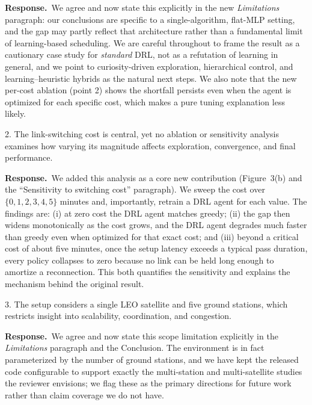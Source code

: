 \documentclass[11pt]{article}
\newcommand{\resp}{\par\smallskip\noindent\textbf{Response.}\ }
\begin{document}
\resp We agree and now state this explicitly in the new \emph{Limitations}
paragraph: our conclusions are specific to a single-algorithm, flat-MLP setting,
and the gap may partly reflect that architecture rather than a fundamental limit of
learning-based scheduling. We are careful throughout to frame the result as a
cautionary case study for \emph{standard} DRL, not as a refutation of learning in
general, and we point to curiosity-driven exploration, hierarchical control, and
learning--heuristic hybrids as the natural next steps. We also note that the new
per-cost ablation (point 2) shows the shortfall persists even when the agent is
optimized for each specific cost, which makes a pure tuning explanation less likely.

\begin{rc}
2. The link-switching cost is central, yet no ablation or sensitivity analysis
examines how varying its magnitude affects exploration, convergence, and final
performance.
\end{rc}

\resp We added this analysis as a core new contribution (Figure~3(b) and the
``Sensitivity to switching cost'' paragraph). We sweep the cost over
$\{0,1,2,3,4,5\}$ minutes and, importantly, retrain a DRL agent for each value.
The findings are: (i) at zero cost the DRL agent matches greedy; (ii) the gap then
widens monotonically as the cost grows, and the DRL agent degrades much faster than
greedy even when optimized for that exact cost; and (iii) beyond a critical cost of
about five minutes, once the setup latency exceeds a typical pass duration, every
policy collapses to zero because no link can be held long enough to amortize a
reconnection. This both quantifies the sensitivity and explains the mechanism behind
the original result.

\begin{rc}
3. The setup considers a single LEO satellite and five ground stations, which
restricts insight into scalability, coordination, and congestion.
\end{rc}

\resp We agree and now state this scope limitation explicitly in the
\emph{Limitations} paragraph and the Conclusion. The environment is in fact
parameterized by the number of ground stations, and we have kept the released code
configurable to support exactly the multi-station and multi-satellite studies the
reviewer envisions; we flag these as the primary directions for future work rather
than claim coverage we do not have.
\end{document}
